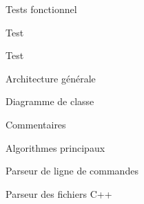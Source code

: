 \documentclass{article}
\begin{document}
\begin{section}{Tests fonctionnel}


  \begin{subsection}{Test }
  \end{subsection}


  \begin{subsection}{Test }
  \end{subsection}

\end{section}





\begin{section}{Architecture générale}

  \begin{subsection}{Diagramme de classe}
  \end{subsection}

  \begin{subsection}{Commentaires}
  \end{subsection}

\end{section}


\begin{section}{Algorithmes principaux}

  \begin{subsection}{Parseur de ligne de commandes}
  \end{subsection}

  \begin{subsection}{Parseur des fichiers C++}
  \end{subsection}

\end{section}
\end{document}
